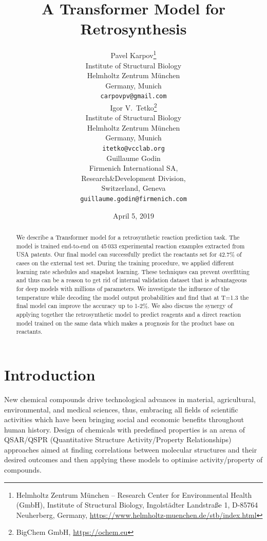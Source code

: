 \documentclass{article}
\title{A Transformer Model for Retrosynthesis}
\date{April 5, 2019}
\author{
  Pavel Karpov\thanks{Helmholtz Zentrum M{\"u}nchen -- Research Center for Environmental Health (GmbH), Institute of Structural Biology, Ingolst{\"a}dter Landstra{\ss}e 1, D-85764 Neuherberg, Germany, \url{https://www.helmholtz-muenchen.de/stb/index.html}}\\
  Institute of Structural Biology\\
  Helmholtz Zentrum M{\"u}nchen\\
  Germany, Munich \\
  \texttt{carpovpv@gmail.com} \\
  \And
  Igor V.~Tetko\thanks{BigChem GmbH, \url{https://ochem.eu}} \\
  Institute of Structural Biology\\
  Helmholtz Zentrum M{\"u}nchen\\
  Germany, Munich \\ 
  \texttt{itetko@vcclab.org} \\
  \And 
  Guillaume Godin\\
  Firmenich International SA,\\
  Research\&Development Division, \\
  Switzerland, Geneva \\
  \texttt{guillaume.godin@firmenich.com}
}
\begin{document}
\maketitle

\begin{abstract}
We describe a Transformer model for a retrosynthetic reaction prediction task. 
The model is trained end-to-end on 45\,033 experimental reaction examples extracted 
from USA patents. Our final model can successfully predict the reactants set for 
42.7\% of cases on the external test set. During the training procedure, we applied 
different learning rate schedules and snapshot learning. These techniques can prevent 
overfitting and thus can be a reason to get rid of internal validation dataset that 
is advantageous for deep models with millions of parameters. We investigate 
the influence of the temperature while decoding the model output probabilities and find 
that at T=1.3 the final model can improve the accuracy up to 1-2\%. 
We also discuss the synergy of applying together the retrosynthetic model to predict 
reagents and a direct reaction model trained on the same data which makes a prognosis 
for the product base on reactants.
\end{abstract}


\section{Introduction}
New chemical compounds drive technological advances in material, agricultural, environmental, and medical sciences, thus, embracing all fields of scientific activities which have been bringing social and economic benefits throughout human history. Design of chemicals with predefined properties is an arena of QSAR/QSPR (Quantitative Structure Activity/Property Relationships) approaches aimed at finding correlations between molecular structures and their desired outcomes and then applying these models to optimise activity/property of compounds. 
\end{document}

